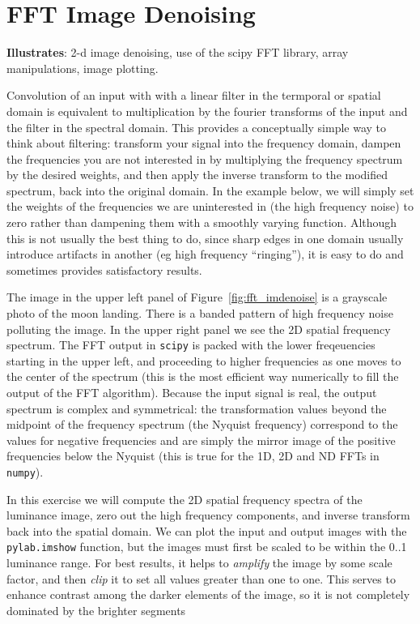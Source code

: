 \section{FFT Image Denoising}
\label{sec:fft_imdenoise}

\textbf{Illustrates}: 2-d image denoising, use of the scipy FFT library,
array manipulations, image plotting.

Convolution of an input with with a linear filter in the termporal or spatial
domain is equivalent to multiplication by the fourier transforms of the input
and the filter in the spectral domain.  This provides a conceptually simple way
to think about filtering: transform your signal into the frequency domain,
dampen the frequencies you are not interested in by multiplying the frequency
spectrum by the desired weights, and then apply the inverse transform to the
modified spectrum, back into the original domain.  In the example below, we
will simply set the weights of the frequencies we are uninterested in (the high
frequency noise) to zero rather than dampening them with a smoothly varying
function.  Although this is not usually the best thing to do, since sharp edges
in one domain usually introduce artifacts in another (eg high frequency
``ringing''), it is easy to do and sometimes provides satisfactory results.

The image in the upper left panel of Figure~\ref{fig:fft_imdenoise} is a
grayscale photo of the moon landing.  There is a banded pattern of high
frequency noise polluting the image.  In the upper right panel we see the 2D
spatial frequency spectrum.  The FFT output in \texttt{scipy} is packed with
the lower freqeuencies starting in the upper left, and proceeding to higher
frequencies as one moves to the center of the spectrum (this is the most
efficient way numerically to fill the output of the FFT algorithm).  Because
the input signal is real, the output spectrum is complex and symmetrical: the
transformation values beyond the midpoint of the frequency spectrum (the
Nyquist frequency) correspond to the values for negative frequencies and are
simply the mirror image of the positive frequencies below the Nyquist (this is
true for the 1D, 2D and ND FFTs in \texttt{numpy}).

In this exercise we will compute the 2D spatial frequency spectra of the
luminance image, zero out the high frequency components, and inverse transform
back into the spatial domain.  We can plot the input and output images with the
\texttt{pylab.imshow} function, but the images must first be scaled to be
within the 0..1 luminance range.  For best results, it helps to
\textit{amplify} the image by some scale factor, and then \textit{clip} it to
set all values greater than one to one.  This serves to enhance contrast among
the darker elements of the image, so it is not completely dominated by the
brighter segments

